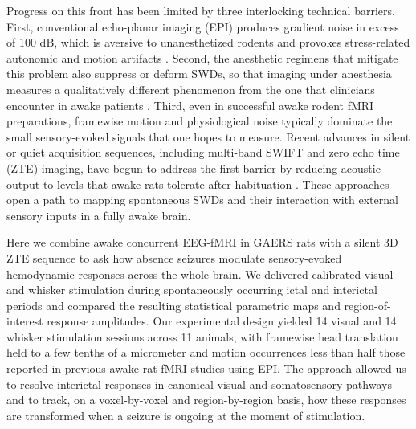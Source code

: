 Progress on this front has been limited by three interlocking technical barriers. First, conventional echo-planar imaging (EPI) produces gradient noise in excess of 100 dB, which is aversive to unanesthetized rodents and provokes stress-related autonomic and motion artifacts \citep{paasonen2018}. Second, the anesthetic regimens that mitigate this problem also suppress or deform SWDs, so that imaging under anesthesia measures a qualitatively different phenomenon from the one that clinicians encounter in awake patients \citep{mishra2011}. Third, even in successful awake rodent fMRI preparations, framewise motion and physiological noise typically dominate the small sensory-evoked signals that one hopes to measure. Recent advances in silent or quiet acquisition sequences, including multi-band SWIFT and zero echo time (ZTE) imaging, have begun to address the first barrier by reducing acoustic output to levels that awake rats tolerate after habituation \citep{paasonen2020,wiesinger2022,lehto2017,stenroos2018}. These approaches open a path to mapping spontaneous SWDs and their interaction with external sensory inputs in a fully awake brain.

Here we combine awake concurrent EEG-fMRI in GAERS rats with a silent 3D ZTE sequence to ask how absence seizures modulate sensory-evoked hemodynamic responses across the whole brain. We delivered calibrated visual and whisker stimulation during spontaneously occurring ictal and interictal periods and compared the resulting statistical parametric maps and region-of-interest response amplitudes. Our experimental design yielded 14 visual and 14 whisker stimulation sessions across 11 animals, with framewise head translation held to a few tenths of a micrometer and motion occurrences less than half those reported in previous awake rat fMRI studies using EPI. The approach allowed us to resolve interictal responses in canonical visual and somatosensory pathways and to track, on a voxel-by-voxel and region-by-region basis, how these responses are transformed when a seizure is ongoing at the moment of stimulation.

